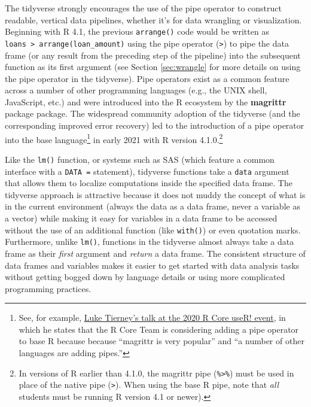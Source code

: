 \documentclass[12pt]{article}
\begin{document}
The tidyverse strongly encourages the use of the pipe operator to
construct readable, vertical data pipelines, whether it's for data
wrangling or visualization. Beginning with R 4.1, the previous
\texttt{arrange()} code would be written as
\texttt{loans\ \textbar{}\textgreater{}\ arrange(loan\_amount)} using
the pipe operator (\texttt{\textbar{}\textgreater{}}) to pipe the data
frame (or any result from the preceding step of the pipeline) into the
subsequent function as its first argument (see Section \ref{sec:wrangle}
for more details on using the pipe operator in the tidyverse). Pipe
operators exist as a common feature across a number of other programming
languages (e.g., the UNIX shell, JavaScript, etc.) and were introduced
into the R ecosystem by the \textbf{magrittr} package \citep{R-magrittr}
package. The widespread community adoption of the tidyverse (and the
corresponding improved error recovery) led to the introduction of a pipe
operator into the base language\footnote{See, for example,
  \href{https://www.youtube.com/watch?v=X_eDHNVceCU\&t=4085s}{Luke
  Tierney's talk at the 2020 R Core useR! event}, in which he states
  that the R Core Team is considering adding a pipe operator to base R
  because because ``magrittr is very popular'' and ``a number of other
  languages are adding pipes.''} in early 2021 with R version
4.1.0.\footnote{In versions of R earlier than 4.1.0, the magrittr pipe
  (\texttt{\%\textgreater{}\%}) must be used in place of the native pipe
  (\texttt{\textbar{}\textgreater{}}). When using the base R pipe, note
  that \emph{all} students must be running R version 4.1 or newer).}

Like the \texttt{lm()} function, or systems such as SAS (which feature a
common interface with a \texttt{DATA\ =} statement), tidyverse functions
take a \texttt{data} argument that allows them to localize computations
inside the specified data frame. The tidyverse approach is attractive
because it does not muddy the concept of what is in the current
environment (always the data as a data frame, never a variable as a
vector) while making it easy for variables in a data frame to be
accessed without the use of an additional function (like
\texttt{with()}) or even quotation marks. Furthermore, unlike
\texttt{lm()}, functions in the tidyverse almost always take a data
frame as their \emph{first} argument and \emph{return} a data frame. The
consistent structure of data frames and variables makes it easier to get
started with data analysis tasks without getting bogged down by language
details or using more complicated programming practices.
\end{document}
